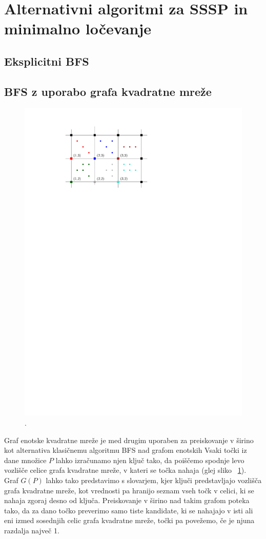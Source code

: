 \documentclass[a4paper, 12pt]{book}
\begin{document}
\section{Alternativni algoritmi za SSSP in minimalno ločevanje}
\subsection{Eksplicitni BFS}

\subsection{BFS z uporabo grafa kvadratne mreže}
\begin{figure}
\centerline{\includegraphics[scale=1.2]{pics/grid.pdf}}
\caption{.}
\label{grid}
\end{figure}

Graf enotske kvadratne mreže je med drugim uporaben za preiskovanje v širino kot alternativa klasičnemu algoritmu BFS nad grafom enotskih   Vsaki točki iz dane množice $P$ lahko izračunamo njen ključ tako, da poiščemo spodnje levo vozlišče celice grafa kvadratne mreže, v kateri se točka nahaja (glej sliko ~\ref{grid}). Graf $G(P)$ lahko tako predstavimo s slovarjem, kjer ključi predstavljajo vozlišča grafa kvadratne mreže, kot vrednosti pa hranijo seznam vseh točk v celici, ki se nahaja zgoraj desno od ključa. Preiskovanje v širino nad takim grafom poteka tako, da za dano točko preverimo samo tiste kandidate, ki se nahajajo v isti ali eni izmed sosednjih celic grafa kvadratne mreže, točki pa povežemo, če je njuna razdalja največ 1. 
\end{document}
